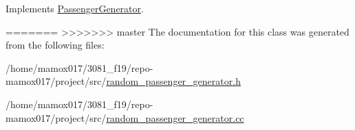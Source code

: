 Implements \hyperlink{classPassengerGenerator_ad2db96a13b34fcf35977287c06b31d47}{Passenger\+Generator}.



=======
>>>>>>> master
The documentation for this class was generated from the following files\+:\begin{DoxyCompactItemize}
\item 
/home/mamox017/3081\+\_\+f19/repo-\/mamox017/project/src/\hyperlink{random__passenger__generator_8h}{random\+\_\+passenger\+\_\+generator.\+h}\item 
/home/mamox017/3081\+\_\+f19/repo-\/mamox017/project/src/\hyperlink{random__passenger__generator_8cc}{random\+\_\+passenger\+\_\+generator.\+cc}\end{DoxyCompactItemize}
